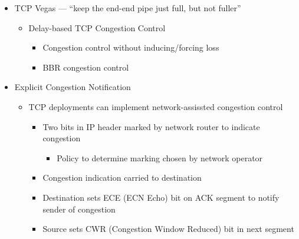 \begin{itemize}
  \item TCP Vegas — ``keep the end-end pipe just full, but not fuller''

    \begin{itemize}

      \item Delay-based TCP Congestion Control

        \begin{itemize}

          \item Congestion control without inducing/forcing loss

          \item BBR congestion control

        \end{itemize}

    \end{itemize}

  \item Explicit Congestion Notification

    \begin{itemize}

      \item TCP deployments can implement network-assissted congestion control

        \begin{itemize}

          \item Two bits in IP header marked by network router to indicate congestion
            \begin{itemize}

              \item Policy to determine marking chosen by network operator

            \end{itemize}

          \item Congestion indication carried to destination

          \item Destination sets ECE (ECN Echo) bit on ACK segment to notify sender of congestion

          \item Source sets CWR (Congestion Window Reduced) bit in next segment

        \end{itemize}

    \end{itemize}

\end{itemize}



